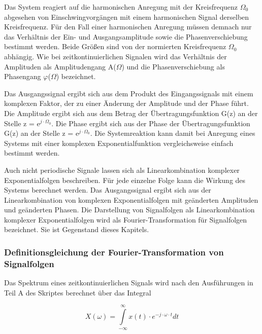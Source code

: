 \noindent Das System reagiert auf die harmonischen Anregung mit der Kreisfrequenz $\Omega_{0}$ abgesehen von Einschwingvorg\"{a}ngen mit einem harmonischen Signal derselben Kreisfrequenz. F\"{u}r den Fall einer harmonischen Anregung m\"{u}ssen demnach nur das Verh\"{a}ltnis der Ein- und Ausgangsamplitude sowie die Phasenverschiebung bestimmt werden. Beide Gr\"{o}{\ss}en sind von der normierten Kreisfrequenz $\Omega_{0}$ abh\"{a}ngig. Wie bei zeitkontinuierlichen Signalen wird das Verh\"{a}ltnis der Amplituden als Amplitudengang A($\Omega$) und die Phasenverschiebung als Phasengang $\varphi$($\Omega$) bezeichnet. 

\noindent Das Ausgangssignal ergibt sich aus dem Produkt des Eingangssignals mit einem komplexen Faktor, der zu einer \"{A}nderung der Amplitude und der Phase f\"{u}hrt. Die Amplitude ergibt sich aus dem Betrag der \"{U}bertragungsfunktion G(z) an der Stelle z = e$^{j\cdot \Omega_{0}}$. Die Phase ergibt sich aus der Phase der \"{U}bertragungsfunktion G(z) an der Stelle z = e$^{j\cdot \Omega_{0}}$. Die Systemreaktion kann damit bei Anregung eines Systems mit einer komplexen Exponentialfunktion vergleichsweise einfach bestimmt werden. \newline

\noindent Auch nicht periodische Signale lassen sich als Linearkombination komplexer Exponentialfolgen beschreiben. F\"{u}r jede einzelne Folge kann die Wirkung des Systems berechnet werden. Das Ausgangssignal ergibt sich aus der Linearkombination von komplexen Exponentialfolgen mit ge\"{a}nderten Amplituden und ge\"{a}nderten Phasen. Die Darstellung von Signalfolgen als Linearkombination komplexer Exponentialfolgen wird als Fourier-Transformation f\"{u}r Signalfolgen bezeichnet. Sie ist Gegenstand dieses Kapitels.

\subsubsection{Definitionsgleichung der Fourier-Transformation von Signalfolgen}

\noindent Das Spektrum eines zeitkontinuierlichen Signals wird nach den Ausf\"{u}hrungen in Teil A des Skriptes berechnet \"{u}ber das Integral 

\begin{equation}\label{eq:sevenseven}
X\left(\omega \right)=\int\limits _{-\infty }^{\infty }x\left(t\right)\cdot e^{-j\cdot \omega \cdot t}dt
\end{equation}

